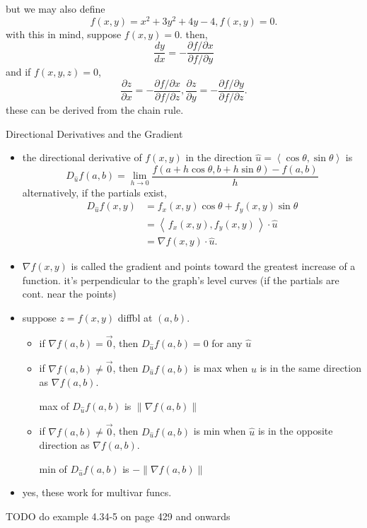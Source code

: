 \documentclass[11pt]{article}
\theoremstyle{definition}
\newcommand{\col}[1]{\begin{minipage}{\columnwidth}#1\end{minipage}}
\newcommand{\magn}[1]{\left\lVert #1 \right\rVert}
\begin{document}
\begin{multicols}{2}
{\begin{itemize}
      but we may also define 
      \[ f(x,y) = x^2 + 3y^2 + 4y - 4, f(x,y) = 0.\]
      with this in mind, suppose $f(x,y)=0$. then,
      \[ \frac{dy}{dx} = -\frac{\partial f/\partial x}{\partial f/\partial y} \]
      and if $f(x,y,z) = 0$,
      \[ \frac{\partial z}{\partial x} = -\frac{\partial f/\partial x}{\partial f/\partial z}, \frac{\partial z}{\partial y} = -\frac{\partial f/\partial y}{\partial f/\partial z}.\]
      these can be derived from the chain rule.
    \end{itemize}
  }
  \col{
    Directional Derivatives and the Gradient
    \begin{itemize}
      \item the directional derivative of $f(x,y)$ in the direction $\hat{u} = \left<\cos\theta, \sin\theta\right>$ is
      \[ D_{\hat{u}}f(a,b) = \lim_{h\rightarrow 0}\frac{f(a+h\cos\theta, b+h\sin\theta)-f(a,b)}{h}\]
      alternatively, if the partials exist,
      \begin{align*}
        D_{\hat{u}}f(x,y) &= f_x(x,y)\cos\theta + f_y(x,y)\sin\theta \\
        &= \left<\,f_x(x,y), f_y(x,y)\,\right> \cdot \hat{u} \\
        &= \nabla f(x,y) \cdot \hat{u}.
      \end{align*}
      \item $\nabla f(x,y)$ is called the gradient and points toward the greatest increase of a function. it's perpendicular to the graph's level curves (if the partials are cont. near the points)
      \item suppose $z=f(x,y)$ diffbl at $(a,b)$.
      \begin{itemize}
        \item if $\nabla f(a,b) = \vec{0}$, then $D_{\hat{u}}f(a,b) = 0$ for any $\hat{u}$
        \item if $\nabla f(a,b) \ne \vec{0}$, then $D_{\hat{u}}f(a,b)$ is max when $\hat{u}$ is in the same direction as $\nabla f(a,b)$.
        
        max of $D_{\hat{u}}f(a,b)$ is $\magn{\nabla f(a,b)}$
        \item if $\nabla f(a,b) \ne \vec{0}$, then $D_{\hat{u}}f(a,b)$ is min when $\hat{u}$ is in the opposite direction as $\nabla f(a,b)$.
        
        min of $D_{\hat{u}}f(a,b)$ is $-\magn{\nabla f(a,b)}$
      \end{itemize}
      \item yes, these work for multivar funcs.
    \end{itemize}    
    TODO do example 4.34-5 on page 429 and onwards 
  }
\end{multicols}
\end{document}

